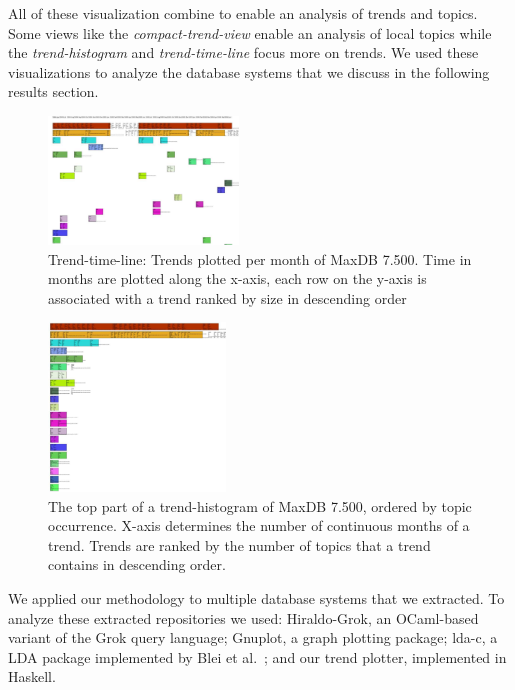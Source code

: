 \documentclass[times, 10pt,twocolumn]{article}
\newcommand{\shrinkit}{\vspace*{-.3em}}
\begin{document}
 All of these visualization combine to enable an analysis of
  trends and topics. Some views like the \emph{compact-trend-view}
  enable an analysis of local topics while the \emph{trend-histogram}
  and \emph{trend-time-line} focus more on trends. We used these
  visualizations to analyze the database systems that we discuss in
  the following results section.  



\begin{figure}[t]
  \centering
  \includegraphics[width=0.45\textwidth]{class-smear-plot-crop-scaled}
  \caption{Trend-time-line: Trends plotted per month of MaxDB 7.500. Time in months are plotted along the x-axis, each row on the y-axis is associated with a trend ranked by size in descending order}         
  \label{fig:trendtimeline}
\end{figure}


\begin{figure}[t]
  \centering
  \includegraphics[width=0.42\textwidth]{histogram-cropped-scaled}
  \caption{The top part of a trend-histogram of MaxDB 7.500, ordered
    by topic occurrence. X-axis determines the number of continuous
    months of a trend. Trends are ranked by the number of topics that
    a trend contains in descending order.}
  \label{fig:histogram}
\end{figure}



\shrinkit
{}
\shrinkit

We applied our methodology to multiple database systems that we
extracted.  To analyze these extracted repositories we used:
Hiraldo-Grok, an OCaml-based variant of the Grok query language;
Gnuplot, a graph plotting package; lda-c, a LDA package implemented by
Blei et al.~\cite{944937}; and our trend plotter, implemented in
Haskell.
\end{document}
